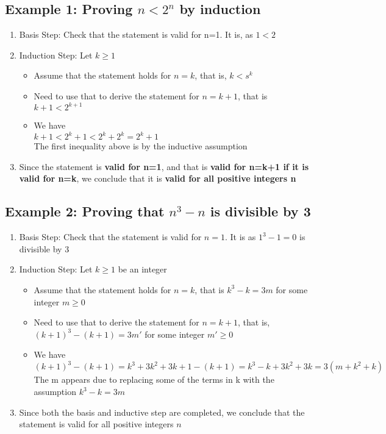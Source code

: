\documentclass{article}[18pt]
\begin{document}
\subsection{Example 1: Proving $n< 2^n$ by induction}
\begin{enumerate}
\item Basis Step: Check that the statement is valid for n=1. It is, as $1<2$
\item Induction Step: Let $k\geqslant 1$ \begin{itemize}
\item Assume that the statement holds for $n=k$, that is, $k<s^k$
\item Need to use that to derive the statement for $n=k+1$, that is $k+1<2^{k+1}$
\item We have\\ $k+1<2^k+1<2^k+2^k=2^k+1$\\ The first inequality above is by the inductive assumption
\end{itemize}
\item Since the statement is \textbf{valid for n=1}, and that is \textbf{valid for n=k+1 if it is valid for n=k}, we conclude that it is \textbf{valid for all positive integers n}
\end{enumerate}
\subsection{Example 2: Proving that $n^3-n$ is divisible by 3}
\begin{enumerate}
\item Basis Step: Check that the statement is valid for $n=1$. It is as $1^3-1=0$ is divisible by 3
\item Induction Step: Let $k\geqslant 1$ be an integer\begin{itemize}
\item Assume that the statement holds for $n=k$, that is $k^3-k=3m$ for some integer $m\geqslant 0$
\item Need to use that to derive the statement for $n=k+1$, that is, $(k+1)^3-(k+1)=3m'$ for some integer $m'\geqslant0$
\item We have\\ $(k+1)^3-(k+1)=k^3+3k^2+3k+1-(k+1)=k^3-k+3k^2+3k=3(m+k^2+k)$ \\ The m appears due to replacing some of the terms in k with the assumption $k^3-k=3m$
\end{itemize}
\item Since both the basis and inductive step are completed, we conclude that the statement is valid for all positive integers $n$
\end{enumerate}
\end{document}
